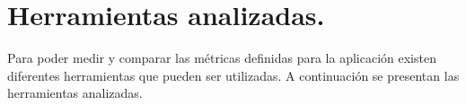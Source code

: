 
\section{Herramientas analizadas.}
\label{capitulo3:herramientas}
Para poder medir y comparar las métricas definidas para la aplicación existen diferentes herramientas que pueden ser utilizadas. A continuación se presentan las herramientas analizadas.

\begin{comment}
\subsection{JMeter}
JMeter es una herramienta de escritorio desarrollada en Java y auspiciada por la Apache Software Foundation. Con este software libre, se pueden definir plantillas para programar baterías de test donde se simulen accesos concurrentes y medir de esta forma los tiempos de respuesta y el rendimiento global del sistema.
Esta herramienta puede ser utilizada como una herramienta de prueba de carga para analizar y medir el desempeño de una variedad de servicios, con énfasis en aplicaciones web.
JMeter puede ser usado como una herramienta de pruebas unitarias para conexiones de bases de datos con JDBC, FTP, LDAP, Servicios web, JMS, HTTP y conexiones TCP genéricas. 
JMeter puede utilizarse para evaluar la performance de recursos estáticos o dinámicos (archivos, servlets, objetos Java, bases de datos y queries, Servidores FTP, entre muchos otros). Se utiliza para simular una carga pesada sobre un servidor, red u objeto para analizar la performance total bajo diferentes tipos de carga. La herramienta puede utilizarse también para obtener análisis gráficos de la performance de la aplicación evaluada o testear el comportamiento de un servidor, script u objeto bajo grandes cargas concurrentes.
JMeter brinda muchas posibilidades y es por ello que es una de las herramientas más utilizadas en el mercado.
La herramienta permite realizar pruebas de carga y performance de diferentes tipos de servidores(Web, HTTP, HTTPS, SOAP. Database via JDBC, Mail-SMTP, POP3,IMAP). Además, es totalmente portable y está desarrollado en un 100\% en java. Además, brinda un framework para el manejo de múltiples hilos permitiendo una muestra concurrente mediante la ejecución de múltiples hilos y permitiendo una prueba simultanea por funcionalidad al definir diferentes grupos de hilos. Además, existen funciones para permitir el ingreso dinámico de datos a una prueba y la posibilidad de manipular dichos datos.
JMeter realiza muchas de las funcionalidades de un navegador al ejecutar una prueba, pero no todas. En particular, JMeter no ejecuta el Javascript que pueda encontrarse en las páginas HTML y tampoco renderiza dichos archivos HTML como lo haría un navegador.
\end{comment}

